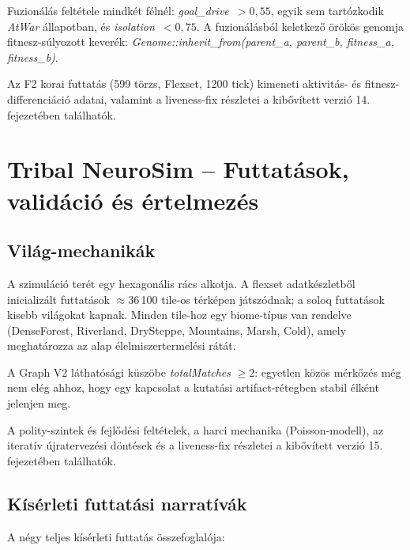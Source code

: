 Fuzionálás feltétele mindkét félnél: \textit{goal\_drive}~$> 0{,}55$, egyik sem tartózkodik \textit{AtWar} állapotban, és \textit{isolation}~$< 0{,}75$. A fuzionálásból keletkező örökös genomja fitnesz-súlyozott keverék: \textit{Genome::inherit\_from(parent\_a, parent\_b, fitness\_a, fitness\_b)}.

Az F2 korai futtatás (599 törzs, Flexset, 1200 tick) kimeneti aktivitás- és fitnesz-differenciáció adatai, valamint a liveness-fix részletei a kibővített verzió 14. fejezetében találhatók.

\chapter{Tribal NeuroSim -- Futtatások, validáció és értelmezés}

\section{Világ-mechanikák}

A szimuláció terét egy hexagonális rács alkotja. A flexset adatkészletből inicializált futtatások $\approx$36\,100 tile-os térképen játszódnak; a soloq futtatások kisebb világokat kapnak. Minden tile-hoz egy biome-típus van rendelve (DenseForest, Riverland, DrySteppe, Mountains, Marsh, Cold), amely meghatározza az alap élelmiszertermelési rátát.

A Graph V2 láthatósági küszöbe \textit{totalMatches} $\geq 2$: egyetlen közös mérkőzés még nem elég ahhoz, hogy egy kapcsolat a kutatási artifact-rétegben stabil élként jelenjen meg.

A polity-szintek és fejlődési feltételek, a harci mechanika (Poisson-modell), az iteratív újratervezési döntések és a liveness-fix részletei a kibővített verzió 15. fejezetében találhatók.

\section{Kísérleti futtatási narratívák}

A négy teljes kísérleti futtatás összefoglalója:

